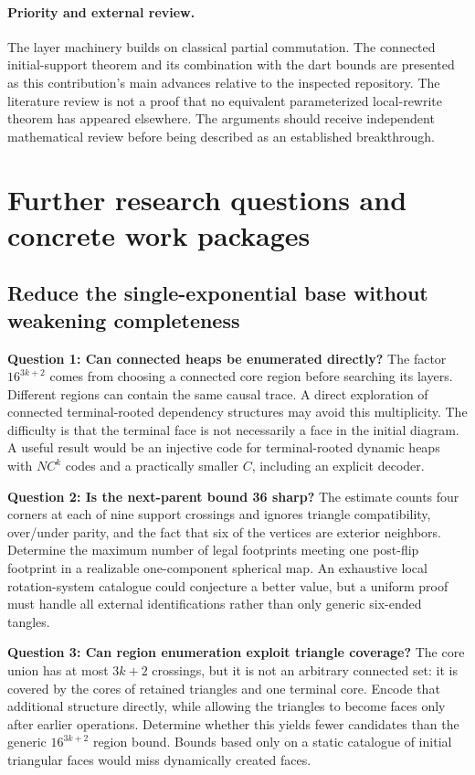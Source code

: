 \documentclass[11pt]{article}
\theoremstyle{definition}
\begin{document}
\paragraph{Priority and external review.}
The layer machinery builds on classical partial commutation. The connected
initial-support theorem and its combination with the dart bounds are
presented as this contribution's main advances relative to the inspected
repository. The literature review is not a proof that no equivalent
parameterized local-rewrite theorem has appeared elsewhere. The arguments
should receive independent mathematical review before being described as
an established breakthrough.

\section{Further research questions and concrete work packages}
\label{sec:future}

\subsection{Reduce the single-exponential base without weakening completeness}

\textbf{Question 1: Can connected heaps be enumerated directly?}
The factor $16^{3k+2}$ comes from choosing a connected core region before
searching its layers. Different regions can contain the same causal
trace. A direct exploration of connected terminal-rooted dependency
structures may avoid this multiplicity. The difficulty is that the
terminal face is not necessarily a face in the initial diagram. A useful
result would be an injective code for terminal-rooted dynamic heaps with
$N C^k$ codes and a practically smaller $C$, including an explicit decoder.

\textbf{Question 2: Is the next-parent bound 36 sharp?}
The estimate counts four corners at each of nine support crossings and
ignores triangle compatibility, over/under parity, and the fact that six
of the vertices are exterior neighbors. Determine the maximum number of
legal footprints meeting one post-flip footprint in a realizable
one-component spherical map. An exhaustive local rotation-system catalogue
could conjecture a better value, but a uniform proof must handle all
external identifications rather than only generic six-ended tangles.

\textbf{Question 3: Can region enumeration exploit triangle coverage?}
The core union has at most $3k+2$ crossings, but it is not an arbitrary
connected set: it is covered by the cores of retained triangles and one
terminal core. Encode that additional structure directly, while allowing
the triangles to become faces only after earlier operations. Determine
whether this yields fewer candidates than the generic $16^{3k+2}$ region
bound. Bounds based only on a static catalogue of initial triangular
faces would miss dynamically created faces.
\end{document}
